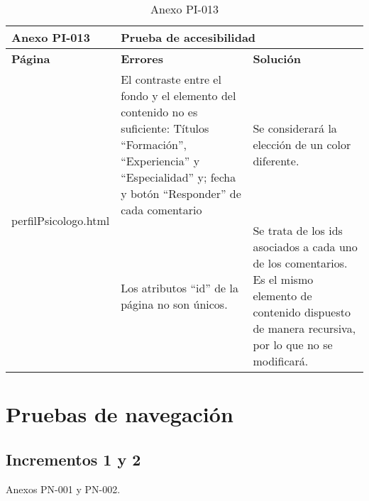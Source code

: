 \begin{table}[htpb]
\centering
\begin{tabularx}{\textwidth}{|l|X|X|}
\hline
\textbf{Anexo PI-013} & \multicolumn{2}{l|}{\textbf{Prueba de accesibilidad}}                                                                                                                                                                                                                                                                                 \\ \hline
\textbf{Página}       & \textbf{Errores}                                                                                                                                                         & \textbf{Solución}                                                                                                                                          \\ \hline
\multirow{2}{*}{perfilPsicologo.html}  & El contraste entre el fondo y el elemento del contenido no es suficiente: Títulos “Formación”, “Experiencia” y “Especialidad” y; fecha y botón “Responder” de cada comentario & Se considerará la elección de un color diferente.                                                                                                          \\ \cline{2-3} 
                      & Los atributos “id” de la página no son únicos.                                                                                                                           & Se trata de los ids asociados a cada uno de los comentarios. Es el mismo elemento de contenido dispuesto de manera recursiva, por lo que no se modificará. \\ \hline
\end{tabularx}
\caption{Anexo PI-013}
\end{table}


\section{Pruebas de navegación}

\subsection{Incrementos 1 y 2}
Anexos PN-001 y PN-002.

